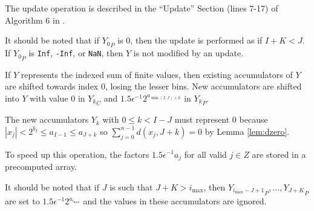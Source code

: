     The update operation is described in the ``Update'' Section (lines 7-17) of Algorithm $6$ in \cite{repsum}.

    It should be noted that if ${Y_0}_P$ is 0, then the update is performed as
    if $I + K < J$. If ${Y_0}_P$ is \texttt{Inf}, \texttt{-Inf}, or
    \texttt{NaN}, then $Y$ is not modified by an update.

    If $Y$ represents the indexed sum of finite values, then existing accumulators of $Y$ are shifted towards index $0$, losing the lesser bins. New accumulators are shifted into $Y$ with value $0$ in ${Y_k}_C$ and $1.5  \epsilon^{-1}  2^{a_{\min(I, J) + k}}$ in ${Y_k}_P$.

    The new accumulators $Y_k$ with $0 \leq k < I - J$ must represent 0 because
    $|x_j| < 2^{b_I} \leq a_{I - 1} \leq a_{J + k}$ so
    \(
      \sum\limits_{j = 0}^{n - 1} d(x_j, J + k) = 0
    \) by Lemma \ref{lem:dzero}.

    To speed up this operation, the factors $1.5  \epsilon^{-1}  a_j$ for all
    valid $j \in Z$ are stored in a precomputed array.

    It should be noted that if $J$ is such that $J + K > i_{\max}$, then
    ${Y_{i_{\max} - J + 1}}_P, ...,  {Y_{J + K}}_P$ are set to $1.5
    \epsilon^{-1}2^{a_{i_{\max}}}$ and the values in these accumulators are
    ignored.
